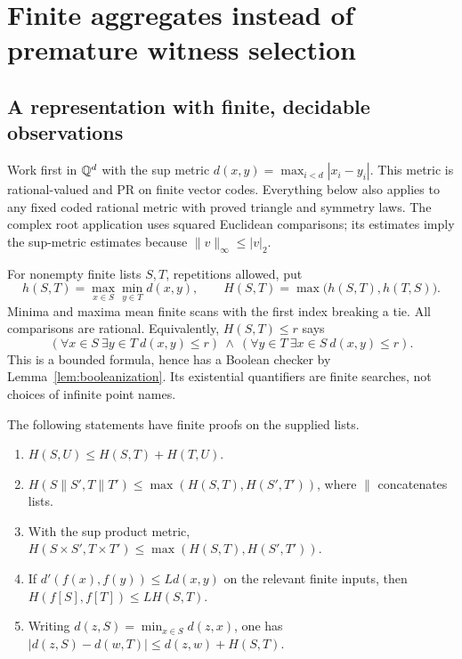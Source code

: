 \section{Finite aggregates instead of premature witness selection}
\label{sec:aggregates}

\subsection{A representation with finite, decidable observations}

Work first in $\mathbb Q^d$ with the sup metric
$d(x,y)=\max_{i<d}|x_i-y_i|$. This metric is rational-valued and PR on
finite vector codes. Everything below also applies to any fixed coded
rational metric with proved triangle and symmetry laws. The complex
root application uses squared Euclidean comparisons; its estimates
imply the sup-metric estimates because $\|v\|_\infty\le|v|_2$.

For nonempty finite lists $S,T$, repetitions allowed, put
\[
 h(S,T)=\max_{x\in S}\min_{y\in T}d(x,y),\qquad
 H(S,T)=\max\bigl(h(S,T),h(T,S)\bigr).
\]
Minima and maxima mean finite scans with the first index breaking a tie.
All comparisons are rational. Equivalently, $H(S,T)\le r$ says
\[
 (\forall x\in S\ \exists y\in T\ d(x,y)\le r)
 \ \wedge\
 (\forall y\in T\ \exists x\in S\ d(x,y)\le r).
 \tag{H}\label{eq:finite-cover}
\]
This is a bounded formula, hence has a Boolean checker by
Lemma~\ref{lem:booleanization}. Its existential quantifiers are finite
searches, not choices of infinite point names.

\begin{lemma}\label{lem:aggregate-calculus}
The following statements have finite proofs on the supplied lists.
\begin{enumerate}
\item $H(S,U)\le H(S,T)+H(T,U)$.
\item $H(S\mathbin{\|}S',T\mathbin{\|}T')\le
 \max(H(S,T),H(S',T'))$, where $\|$ concatenates lists.
\item With the sup product metric,
 $H(S\times S',T\times T')\le\max(H(S,T),H(S',T'))$.
\item If $d'(f(x),f(y))\le Ld(x,y)$ on the relevant finite inputs,
 then $H(f[S],f[T])\le LH(S,T)$.
\item Writing $d(z,S)=\min_{x\in S}d(z,x)$, one has
 $|d(z,S)-d(w,T)|\le d(z,w)+H(S,T)$.
\end{enumerate}
\end{lemma}

